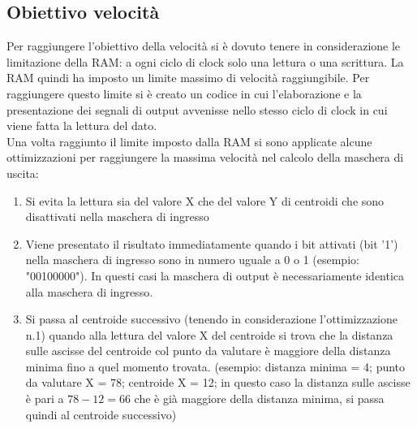 \documentclass{article}
\begin{document}
\subsection{Obiettivo velocità} \label{subsection-ob-vel}
Per raggiungere l'obiettivo della velocità si è dovuto tenere in considerazione le limitazione della RAM: a ogni ciclo di clock solo una lettura o una scrittura. La RAM quindi ha imposto un limite massimo di velocità raggiungibile. Per raggiungere questo limite si è creato un codice in cui l'elaborazione e la presentazione dei segnali di output avvenisse nello stesso ciclo di clock in cui viene fatta la lettura del dato.\\
Una volta raggiunto il limite imposto dalla RAM si sono applicate alcune ottimizzazioni per raggiungere la massima velocità nel calcolo della maschera di uscita:
\begin{enumerate}
    \item Si evita la lettura sia del valore X che del valore Y di centroidi che sono disattivati nella maschera di ingresso
    \item Viene presentato il risultato immediatamente quando i bit attivati (bit '1') nella maschera di ingresso sono in numero uguale a 0 o 1 (esempio: "00100000"). In questi casi la maschera di output è necessariamente identica alla maschera di ingresso.
    \item Si passa al centroide successivo (tenendo in considerazione l'ottimizzazione n.1) quando alla lettura del valore X del centroide si trova che la distanza sulle ascisse del centroide col punto da valutare è maggiore della distanza minima fino a quel momento trovata. (esempio: distanza minima = 4; punto da valutare X = 78; centroide X = 12; in questo caso la distanza sulle ascisse è pari a \(78-12=66\) che è già maggiore della distanza minima, si passa quindi al centroide successivo)
\end{enumerate}
\end{document}
